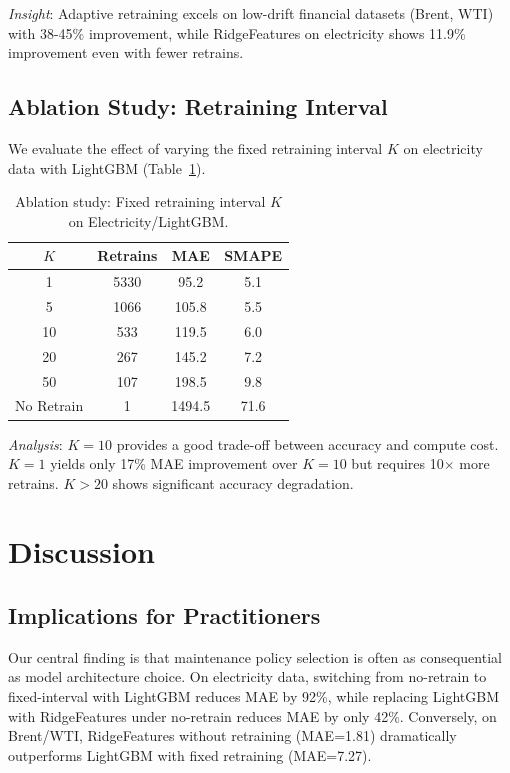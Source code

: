 \documentclass[conference]{IEEEtran}
\begin{document}
\textit{Insight}: Adaptive retraining excels on low-drift financial datasets
(Brent, WTI) with 38-45\% improvement, while RidgeFeatures on electricity shows
11.9\% improvement even with fewer retrains.

\subsection{Ablation Study: Retraining Interval}

We evaluate the effect of varying the fixed retraining interval $K$ on
electricity data with LightGBM (Table~\ref{tab:ablation}).

\begin{table}[!t]
	\centering
	\caption{Ablation study: Fixed retraining interval $K$ on Electricity/LightGBM.}
	\label{tab:ablation}
	\begin{tabular}{c|ccc}
		\toprule
		$K$        & Retrains & MAE    & SMAPE \\
		\midrule
		1          & 5330     & 95.2   & 5.1   \\
		5          & 1066     & 105.8  & 5.5   \\
		10         & 533      & 119.5  & 6.0   \\
		20         & 267      & 145.2  & 7.2   \\
		50         & 107      & 198.5  & 9.8   \\
		No Retrain & 1        & 1494.5 & 71.6  \\
		\bottomrule
	\end{tabular}
\end{table}

\textit{Analysis}: $K=10$ provides a good trade-off between accuracy
and compute cost. $K=1$ yields only 17\% MAE improvement over $K=10$
but requires 10$\times$ more retrains. $K>20$ shows significant
accuracy degradation.

\section{Discussion}

\subsection{Implications for Practitioners}

Our central finding is that maintenance policy selection is often as
consequential as model architecture choice. On electricity data,
switching from no-retrain to fixed-interval with LightGBM reduces MAE
by 92\%, while replacing LightGBM with RidgeFeatures under no-retrain
reduces MAE by only 42\%. Conversely, on Brent/WTI, RidgeFeatures without
retraining (MAE=1.81) dramatically outperforms LightGBM with fixed
retraining (MAE=7.27).
\end{document}
